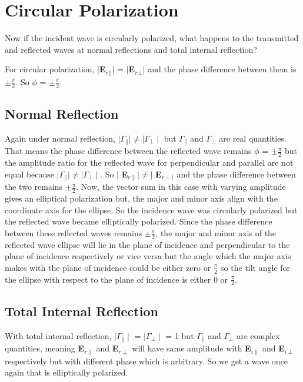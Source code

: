 \section{Circular Polarization}
Now if the incident wave is circularly polarized, what happens to the transmitted and reflected waves at normal reflections and total internal reflection?

For circular polarization, $\mid$\textbf{E$_r$$_\parallel$}$\mid$ = $\mid$\textbf{E$_r$$_\perp$}$\mid$ and the phase difference between them is $\pm\frac{\pi}{2}$. So $\phi$ = $\pm\frac{\pi}{2}$.

\subsection{Normal Reflection}
Again under  normal reflection, $\mid\Gamma_\parallel\mid \neq \mid\Gamma_\perp\mid$ but $\Gamma_\parallel$ and $\Gamma_\perp$ are real quantities. That means the phase difference between the reflected wave remains $\phi$ = $\pm\frac{\pi}{2}$ but the amplitude ratio for the reflected wave for perpendicular and parallel are not equal because $\mid\Gamma_\parallel\mid \neq \mid \Gamma_\perp \mid$. So $\mid$ \textbf{E}$_{r\parallel} \mid \neq \mid$ \textbf{E}$_{r\perp\mid}$ and the phase difference between the two remains $\pm\frac{\pi}{2}$. Now, the vector sum in this case with varying amplitude gives an elliptical polarization but, the major and minor axis align with the coordinate axis for the ellipse. So the incidence wave was circularly polarized but the reflected wave became elliptically polarized. Since the phase difference between these reflected waves remains $\pm\frac{\pi}{2}$, the major and minor axis of the reflected wave ellipse will lie in the plane of incidence and perpendicular to the plane of incidence respectively or vice versa but the angle which the major axis makes with the plane of incidence could be either zero or $\frac{\pi}{2}$ so the tilt angle for the ellipse with respect to the plane of incidence is either 0 or $\frac{\pi}{2}$.

\subsection{Total Internal Reflection}
With total internal reflection, $\mid\Gamma_\parallel\mid$ = $\mid\Gamma_\perp\mid$ = 1 but $\Gamma_\parallel$ and $\Gamma_\perp$ are complex quantities, meaning
\textbf{E}$_{r\parallel}$ and \textbf{E}$_{r\perp}$ will have same amplitude with \textbf{E}$_{i\parallel}$ and \textbf{E}$_{i\perp}$ respectively but with different phase which is arbitrary. So we get a wave once again that is elliptically polarized.

